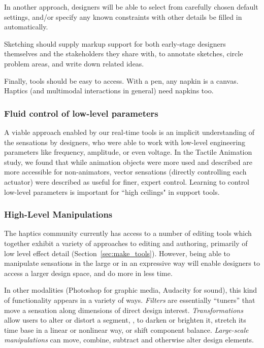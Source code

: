  In another approach, designers will be able to select from carefully chosen default settings, and/or specify  any known constraints with other details be filled in automatically. 
    
 Sketching should supply markup support for both early-stage designers themselves and the stakeholders they share with, to  annotate sketches, circle problem areas, and write down related ideas.
    
 Finally, tools should be easy to access. With a pen, any napkin is a canvas. Haptics (and multimodal interactions in general) need napkins too. 


%
%
\subsubsection{Fluid control of low-level parameters}
A viable approach enabled by our real-time tools is an implicit understanding of the sensations by designers, who were able to work with low-level engineering parameters like frequency, amplitude, or even voltage.
In the Tactile Animation study, we found that while animation objects were more used and described are more accessible for non-animators, vector sensations (directly controlling each actuator) were described as useful for finer, expert control.
Learning to control low-level parameters is important for ``high ceilings" in \haxd support tools.



%
%
\subsubsection{High-Level Manipulations} 
The haptics community currently has access to a number of editing tools which together exhibit a variety of approaches to editing and authoring, primarily of low level effect detail (Section~\ref{sec:make_tools}).
However, being able to manipulate sensations in the large or in an expressive way will enable designers to access a larger design space, and do more in less time.

In other modalities (Photoshop for graphic media, Audacity for sound), this kind of functionality appears in a variety of ways.  
\textit{Filters} are essentially ``tuners'' that move a sensation along dimensions of direct design interest.
\textit{Transformations} allow users to alter or distort a segment, \eg, to darken or brighten it,  stretch its time base in a linear or nonlinear way, or shift component balance.
%
\textit{Large-scale manipulations} can move, combine, subtract and otherwise alter design elements.

